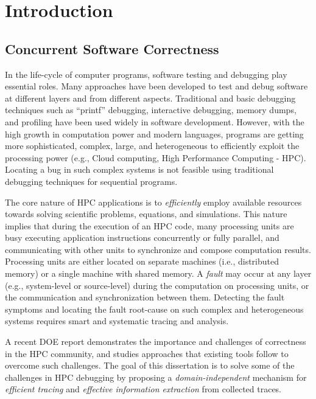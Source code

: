 
\chapter{Introduction}

\section{Concurrent Software Correctness}

In the life-cycle of computer programs, software testing and debugging play essential roles.
%
Many approaches have been developed to test and debug software at different layers and from different aspects.
%
Traditional and basic debugging techniques such as ``printf'' debugging, interactive debugging, memory dumps, and profiling have been used widely in software development.
%
%
However, with the high growth in computation power and modern languages, programs are getting more sophisticated, complex, large, and heterogeneous to efficiently exploit the processing power (e.g., Cloud computing, High Performance Computing - HPC).
%
Locating a bug in such complex systems is not feasible using traditional debugging techniques for sequential programs.
%

The core nature of HPC applications is to \textit{efficiently} employ available resources towards solving scientific problems, equations, and simulations.
%
This nature implies that during the execution of an HPC code, many processing units are busy executing application instructions concurrently or fully parallel, and communicating with other units to synchronize and compose computation results.
%
Processing units are either located on separate machines (i.e., distributed memory) or a single machine with shared memory.
%
A \textit{fault} may occur at any layer (e.g., system-level or source-level) during the computation on processing units, or the communication and synchronization between them.
%
Detecting the fault symptoms and locating the fault root-cause on such complex and heterogeneous systems requires smart and systematic tracing and analysis.
%

A recent DOE report\cite{hpcdoe} demonstrates the importance and challenges of correctness in the HPC community, and studies approaches that existing tools follow to overcome such challenges.
%
The goal of this dissertation is to solve some of the challenges in HPC debugging by proposing a \textit{domain-independent} mechanism for \textit{efficient tracing} and \textit{effective information extraction} from collected traces.


